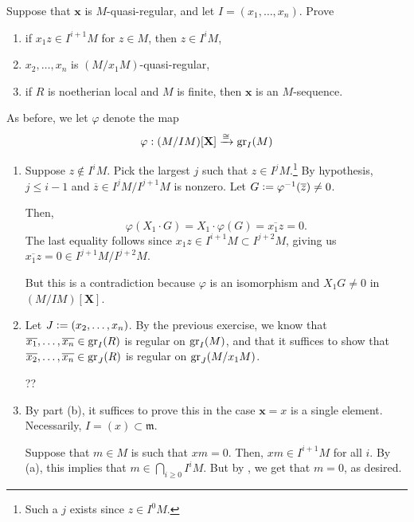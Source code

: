 \documentclass[12pt]{article}
\begin{document}
\begin{exe}
	Suppose that $\mathbf{x}$ is $M$-quasi-regular, and let $I = (x_{1}, \ldots, x_{n})$. Prove
	\begin{enumerate}[label=(\alph*)]
		\item if $x_{1} z \in I^{i + 1} M$ for $z \in M$, then $z \in I^{i} M$,
		\item $x_{2}, \ldots, x_{n}$ is $(M/x_{1} M)$-quasi-regular,
		\item if $R$ is noetherian local and $M$ is finite, then $\mathbf{x}$ is an $M$-sequence.
	\end{enumerate}
\end{exe}
\begin{soln}
	As before, we let $\varphi$ denote the map
	\begin{equation*} 
		\varphi : (M/IM)[\mathbf{X}] \xrightarrow{\cong} \operatorname{gr}_{I}(M)
	\end{equation*}
	\begin{enumerate}[label=(\alph*)]
		\item Suppose $z \notin I^{i} M$. Pick the largest $j$ such that $z \in I^{j} M$.\footnote{Such a $j$ exists since $z \in I^{0}M$.} By hypothesis, $j \le i - 1$ and $\overline{z} \in I^{j} M/I^{j + 1} M$ is nonzero. Let $G \vcentcolon= \varphi^{-1}(\overline{z}) \neq 0$. 

		Then,
		\begin{equation*} 
			\varphi(X_{1} \cdot G) = X_{1} \cdot \varphi(G) = \overline{x_{1} z} = 0.
		\end{equation*}
		The last equality follows since $x_{1} z \in I^{i + 1} M \subset I^{j + 2} M$, giving us $\overline{x_{1} z} = 0 \in I^{j + 1} M/I^{j + 2} M$. 

		But this is a contradiction because $\varphi$ is an isomorphism and $X_{1} G \neq 0$ in $(M/IM)[\mathbf{X}]$.
		\item Let $J \vcentcolon= (x_{2}, \ldots, x_{n})$. By the previous exercise, we know that $\overline{x_{1}}, \ldots, \overline{x_{n}} \in \operatorname{gr}_{I}(R)$ is regular on $\operatorname{gr}_{I}(M)$, and that it suffices to show that $\overline{x_{2}}, \ldots, \overline{x_{n}} \in \operatorname{gr}_{J}(R)$ is regular on $\operatorname{gr}_{J}(M/x_{1} M)$.

		??
		\item By part (b), it suffices to prove this in the case $\mathbf{x} = x$ is a single element. Necessarily, $I = (x) \subset \mathfrak{m}$.

		Suppose that $m \in M$ is such that $x m = 0$. Then, $x m \in I^{i + 1} M$ for all $i$. By (a), this implies that $m \in \bigcap_{i \ge 0} I^{i} M$. But by , we get that $m = 0$, as desired. \qedhere
	\end{enumerate}
\end{soln}
\end{document}
